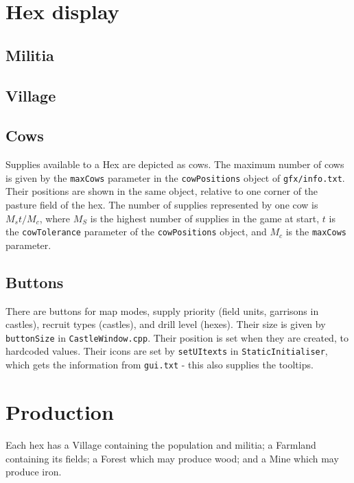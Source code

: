 \documentclass[12pt,ebook,oneside]{book}
\begin{document}
\section{Hex display}

\subsection{Militia}

\subsection{Village}

\subsection{Cows}

Supplies available to a Hex are depicted as cows. The maximum number
of cows is given by the \texttt{maxCows} parameter in the
\texttt{cowPositions} object of \texttt{gfx/info.txt}. Their positions
are shown in the same object, relative to one corner of the pasture
field of the hex. The number of supplies represented by one cow is
$M_st/M_c$, where $M_S$ is the highest number of supplies in the game
at start, $t$ is the \texttt{cowTolerance} parameter of the
\texttt{cowPositions} object, and $M_c$ is the \texttt{maxCows}
parameter. 

\subsection{Buttons}

There are buttons for map modes, supply priority (field units,
garrisons in castles), recruit types (castles), and drill level
(hexes). Their size is given by \texttt{buttonSize} in
\texttt{CastleWindow.cpp}. Their position is set when they are
created, to hardcoded values. Their icons are set by
\texttt{setUItexts} in \texttt{StaticInitialiser}, which gets the
information from \texttt{gui.txt} - this also supplies the tooltips.

\section{Production}

Each hex has a Village containing the population and militia; a
Farmland containing its fields; a Forest which may produce wood; and a
Mine which may produce iron. 
\end{document}
